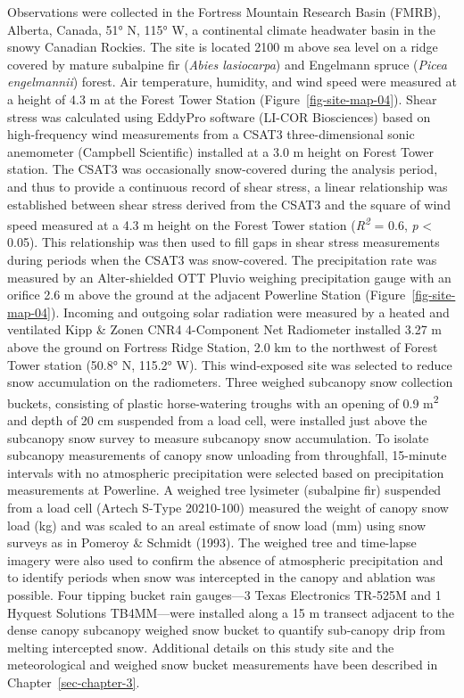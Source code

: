 \documentclass[
  letterpaper,
]{tex/uofsthesis-cs}
\begin{document}
Observations were collected in the Fortress Mountain Research Basin
(FMRB), Alberta, Canada, 51° N, 115° W, a continental climate headwater
basin in the snowy Canadian Rockies. The site is located 2100 m above
sea level on a ridge covered by mature subalpine fir (\emph{Abies
lasiocarpa}) and Engelmann spruce (\emph{Picea engelmannii}) forest. Air
temperature, humidity, and wind speed were measured at a height of 4.3 m
at the Forest Tower Station (Figure~\ref{fig-site-map-04}). Shear stress
was calculated using EddyPro software (LI-COR Biosciences) based on
high-frequency wind measurements from a CSAT3 three-dimensional sonic
anemometer (Campbell Scientific) installed at a 3.0 m height on Forest
Tower station. The CSAT3 was occasionally snow-covered during the
analysis period, and thus to provide a continuous record of shear
stress, a linear relationship was established between shear stress
derived from the CSAT3 and the square of wind speed measured at a 4.3 m
height on the Forest Tower station (\emph{R\textsuperscript{2}} = 0.6,
\emph{p} \textless{} 0.05). This relationship was then used to fill gaps
in shear stress measurements during periods when the CSAT3 was
snow-covered. The precipitation rate was measured by an Alter-shielded
OTT Pluvio weighing precipitation gauge with an orifice 2.6 m above the
ground at the adjacent Powerline Station (Figure~\ref{fig-site-map-04}).
Incoming and outgoing solar radiation were measured by a heated and
ventilated Kipp \& Zonen CNR4 4-Component Net Radiometer installed 3.27
m above the ground on Fortress Ridge Station, 2.0 km to the northwest of
Forest Tower station (50.8° N, 115.2° W). This wind-exposed site was
selected to reduce snow accumulation on the radiometers. Three weighed
subcanopy snow collection buckets, consisting of plastic horse-watering
troughs with an opening of 0.9 m\textsuperscript{2} and depth of 20 cm
suspended from a load cell, were installed just above the subcanopy snow
survey to measure subcanopy snow accumulation. To isolate subcanopy
measurements of canopy snow unloading from throughfall, 15-minute
intervals with no atmospheric precipitation were selected based on
precipitation measurements at Powerline. A weighed tree lysimeter
(subalpine fir) suspended from a load cell (Artech S-Type 20210-100)
measured the weight of canopy snow load (kg) and was scaled to an areal
estimate of snow load (mm) using snow surveys as in Pomeroy \& Schmidt
(1993). The weighed tree and time-lapse imagery were also used to
confirm the absence of atmospheric precipitation and to identify periods
when snow was intercepted in the canopy and ablation was possible. Four
tipping bucket rain gauges---3 Texas Electronics TR-525M and 1 Hyquest
Solutions TB4MM---were installed along a 15 m transect adjacent to the
dense canopy subcanopy weighed snow bucket to quantify sub-canopy drip
from melting intercepted snow. Additional details on this study site and
the meteorological and weighed snow bucket measurements have been
described in Chapter~\ref{sec-chapter-3}.
\end{document}
